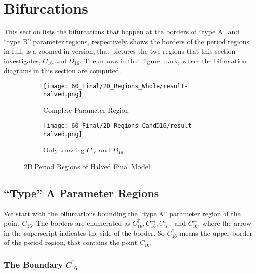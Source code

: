 \section{Bifurcations}

This section lists the bifurcations that happen at the borders of ``type A'' and ``type B'' parameter regions, respectively.
 shows the borders of the period regions in full.
 is a zoomed-in version, that pictures the two regions that this section investigates, $C_{16}$ and $D_{16}$.
The arrows in that figure mark, where the bifurcation diagrams in this section are computed.

\begin{figure}
    \centering
    \begin{subfigure}{0.4\textwidth}
        \centering
        \texttt{[image: 60\_Final/2D\_Regions\_Whole/result-halved.png]}
        \caption{Complete Parameter Region}
        \label{fig:final.regions.whole.halved}
    \end{subfigure}
    \begin{subfigure}{0.4\textwidth}
        \centering
        \texttt{[image: 60\_Final/2D\_Regions\_CandD16/result-halved.png]}
        \caption{Only showing $C_{16}$ and $D_{16}$}
        \label{fig:final.regions.CandD16.halved}
    \end{subfigure}
    \caption{2D Period Regions of Halved Final Model}
\end{figure}

\subsection{``Type'' A Parameter Regions}

We start with the bifurcations bounding the ``type A'' parameter region of the point $C_{16}$.
The borders are enumerated as $C_{16}^\uparrow, C_{16}^\rightarrow, C_{16}^\downarrow,$ and $C_{16}^\leftarrow$, where the arrow in the superscript indicates the side of the border.
So $C_{16}^\uparrow$ means the upper border of the period region, that contains the point $C_{16}$.

\subsubsection{The Boundary $C_{16}^\uparrow$}

